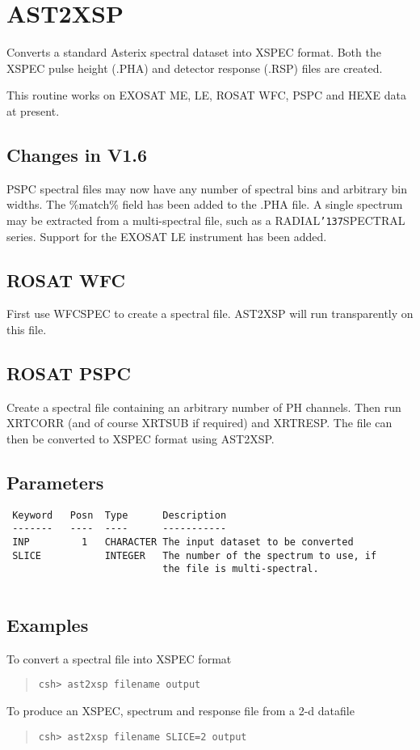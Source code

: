 \documentclass{book}
\renewcommand{\_}{{\tt\char'137}}     %
\begin{document}
\section{AST2XSP}
Converts a standard Asterix spectral dataset into XSPEC format.
Both the XSPEC pulse height (.PHA) and detector response (.RSP)
files are created.
 
This routine works on EXOSAT ME, LE, ROSAT WFC, PSPC and
HEXE data at present.
 
\subsection{Changes in V1.6}
PSPC spectral files may now have any number of spectral bins
and arbitrary bin widths. The \%match\% field has been added to the
.PHA file. A single spectrum may be extracted from a multi-spectral
file, such as a RADIAL\_SPECTRAL series. Support for the EXOSAT LE
instrument has been added.
 
\subsection{ROSAT WFC}
First use WFCSPEC to create a spectral file. AST2XSP will run transparently
on this file.
 
\subsection{ROSAT PSPC}
Create a spectral file containing an arbitrary number of PH channels.
Then run XRTCORR (and of course XRTSUB if required) and XRTRESP.
The file can then be converted to XSPEC format using AST2XSP.
 
\subsection{Parameters}
\begin{verbatim}
 Keyword   Posn  Type      Description
 -------   ----  ----      -----------
 INP         1   CHARACTER The input dataset to be converted
 SLICE           INTEGER   The number of the spectrum to use, if
                           the file is multi-spectral.
 
\end{verbatim}\subsection{Examples}
To convert a spectral file into XSPEC format
\begin{quote}\begin{verbatim}
csh> ast2xsp filename output
\end{verbatim}\end{quote}
To produce an XSPEC, spectrum and response file from a 2-d datafile
\begin{quote}\begin{verbatim}
csh> ast2xsp filename SLICE=2 output
\end{verbatim}\end{quote}
\end{document}
